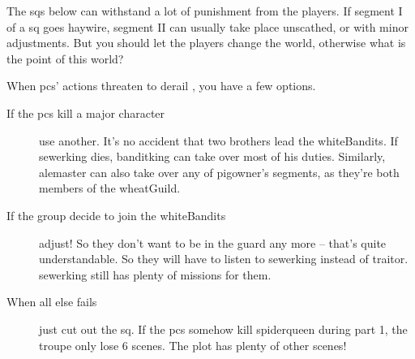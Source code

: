 \begin{multicols}{2}
The \glspl{sq} below can withstand a lot of punishment from the players.
If \gls{segment} I of a \gls{sq} goes haywire, \gls{segment} II can usually take place unscathed, or with minor adjustments.
But you should let the players change the world, otherwise what is the point of this world?

When \glspl{pc}' actions threaten to derail , you have a few options.

\begin{description}
  \item[If the \glspl{pc} kill a major character]
  use another.
  It's no accident that two brothers lead the \gls{whiteBandits}.
  If \gls{sewerking} dies, \gls{banditking} can take over most of his duties.
  Similarly, \gls{alemaster} can also take over any of \gls{pigowner}'s \glspl{segment}, as they're both members of the \gls{wheatGuild}.
  \item[If the group decide to join the \gls{whiteBandits}]
  adjust!
  So they don't want to be in the \gls{guard} any more -- that's quite understandable.
  So they will have to listen to \gls{sewerking} instead of \gls{traitor}.
  \Gls{sewerking} still has plenty of missions for them.
  \item[When all else fails]
  just cut out the \gls{sq}.
  If the \glspl{pc} somehow kill \gls{spiderqueen} during part 1, the troupe only lose 6 scenes.
  The plot has plenty of other scenes!
\end{description}

\renewcommand\csComments{
  \mapCircle{16}{76}{1.7}{Dyson_Logos/bandit_camp}
  \mapCircle{35}{88}{2}{Dyson_Logos/forgotten_city}
  \mapCircle{27}{09}{2}{Dyson_Logos/qualme_temple}
  \mapCircle[4]{56}{52}{2.5}{Dyson_Logos/town}
  \mapCircle{83}{09}{1.7}{Dyson_Logos/shadow_gate}
  \mapCircle{86}{45}{1.7}{Dyson_Logos/lakeside}
  \draw[very thick,white] (11,0.6) -- (12,0.6) node[anchor=north]{\outline{10 Miles}} -- (13,0.6) ;
}




\end{multicols}

